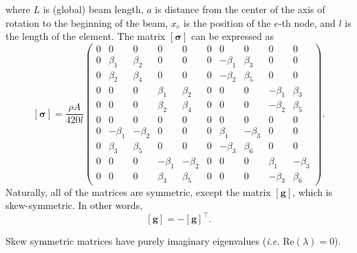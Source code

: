 where $L$ is (global) beam length, $a$ is distance from the center of the axis of rotation to the beginning of the beam, $x_e$ is the position of the $e$-th node, and $l$ is the length of the element.
The matrix $\mathbf{[\sigma]}$ can be expressed as
\[
\mathbf{[\sigma]} = 
\frac{\rho A}{420l}\begin{pmatrix}
 0 & 0 &  0 & 0 &  0 & 0 & 0 & 0 & 0 &  0\\
 0 & \beta_1 & \beta_2 & 0 &  0 & 0 &  -\beta_1  & \beta_3 & 0 & 0\\
 0 & \beta_2 & \beta_4 & 0 &  0 & 0 & -\beta_2 & \beta_5 & 0 & 0\\
 0 & 0 & 0 & \beta_1 & \beta_2 & 0 & 0 & 0 &  -\beta_1  & \beta_3 \\
 0 & 0 & 0 & \beta_2 & \beta_4 & 0 & 0 & 0 & -\beta_2 & \beta_5 \\
 0 & 0 & 0 & 0 & 0 & 0 & 0 & 0 & 0 & 0\\
 0 & -\beta_1 & -\beta_2 & 0 & 0 & 0 & \beta_1 & -\beta_3 & 0 & 0\\
 0 & \beta_3 & \beta_5 & 0 & 0 & 0 & -\beta_3 & \beta_6 & 0 & 0\\
 0 & 0 & 0 & -\beta_1 & -\beta_2 & 0 & 0 & 0 & \beta_1 & -\beta_3 \\
 0 & 0 & 0 & \beta_3 & \beta_5  & 0 & 0 & 0 & -\beta_3 &  \beta_6
\end{pmatrix}.
\]
Naturally, all of the matrices are symmetric, except the matrix $\mathbf{[g]}$, which is skew-symmetric. In other words, 
\begin{equation}
\mathbf{[g]} = -\mathbf{[g]}^\top.
\end{equation}
\begin{lemma}
Skew symmetric matrices have purely imaginary eigenvalues (\emph{i.e.} $\text{Re}(\lambda)=0$). 
\end{lemma}
